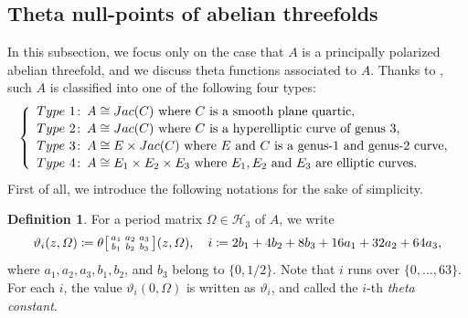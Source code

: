 \documentclass{amsart}
\theoremstyle{definition}
\newtheorem{Def}{Definition}[section]
\theoremstyle{plain}
\begin{document}
\subsection{Theta null-points of abelian threefolds}\label{g=3}
In this subsection, we focus only on the case that $A$ is a principally polarized abelian threefold, and we discuss theta functions associated to $A$.
Thanks to \cite[Corollary 11.8.2]{Lange}, such $A$ is classified into one of the following four types:
\begin{equation*}
    \begin{split}
    \left\{
    \begin{array}{l}
    {\rm Type\ 1\!:\ }\,A \cong {\rm Jac}(C)\ \text{where}\ C\ \text{is\ a\ smooth\ plane\ quartic},\\[0.5mm]
    {\rm Type\ 2\!:\ }\,A \cong {\rm Jac}(C)\ \text{where}\ C\ \text{is\ a\ hyperelliptic\ curve\ of\ genus\ } 3,\\[0.5mm]
    {\rm Type\ 3\!:\ }\,A \cong E \times {\rm Jac}(C)\ \text{where}\ E\ \text{and}\ C\text{\ is\ a genus-1 and genus-2 curve},\\[0.5mm]
    {\rm Type\ 4\!:\ }\,A \cong E_1 \times E_2 \times E_3\ \text{where}\ E_1,E_2 \text{\ and\ } E_3 \text{\ are\ elliptic\ curves}.
    \end{array}
    \right.
    \end{split}
\end{equation*}
First of all, we introduce the following notations for the sake of simplicity.
\begin{Def}\label{notation}
For a period matrix $\varOmega \in \mathcal{H}_3$ of $A$, we write\smallskip
\[
    \vartheta_i(z,\varOmega) \coloneqq \theta\bigl[\begin{smallmatrix}a_1 & a_2 & a_3\\b_1 & b_2 & b_3\end{smallmatrix}\bigr](z,\varOmega), \quad i \coloneqq 2b_1 + 4b_2 + 8b_3 + 16a_1 + 32a_2 + 64a_3,\medskip
\]
where $a_1,a_2,a_3,b_1,b_2$, and $b_3$ belong to $\{0,1/2\}$.
Note that $i$ runs over $\{0,\ldots,63\}$.
For each $i$, the value $\vartheta_i(0,\varOmega)$ is written as $\vartheta_i$, and called the $i$-th \emph{theta constant}.
\end{Def}
\end{document}
